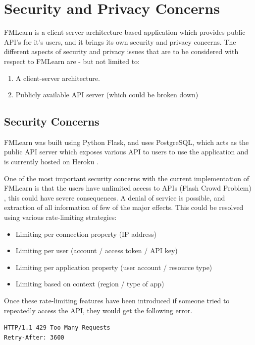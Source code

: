 \section{Security and Privacy Concerns}
FMLearn is a client-server architecture-based \citep{clientserver} application which provides public API’s for it's users, and it brings its own security and privacy concerns. The different aspects of security and privacy issues that are to be considered with respect to FMLearn are - but not limited to:

\begin{enumerate}
    \item A client-server architecture.
    \item Publicly available API server \citep{input-validation} (which could be broken down)
\end{enumerate}

\subsection{Security Concerns}

FMLearn was built using Python Flask, and uses PostgreSQL, which acts as the public API server which exposes various API to users to use the application and is currently hosted on Heroku .

One of the most important security concerns with the current implementation of FMLearn is that the users have unlimited access to APIs (Flash Crowd Problem) \citep{flash-crowd}, this could have severe consequences. A denial of service is possible, and extraction of all information of few of the major effects. This could be resolved using various rate-limiting strategies:

\begin{itemize} 
    \item Limiting per connection property (IP address)
    \item Limiting per user (account / access token / API key)
    \item Limiting per application property (user account / resource type)
    \item Limiting based on context (region / type of app)
\end{itemize}

Once these rate-limiting features have been introduced if someone tried to repeatedly access the API, they would get the following error.

\begin{center}
\texttt{HTTP/1.1 429 Too Many Requests}\\
\texttt{Retry-After: 3600}
\end{center}

